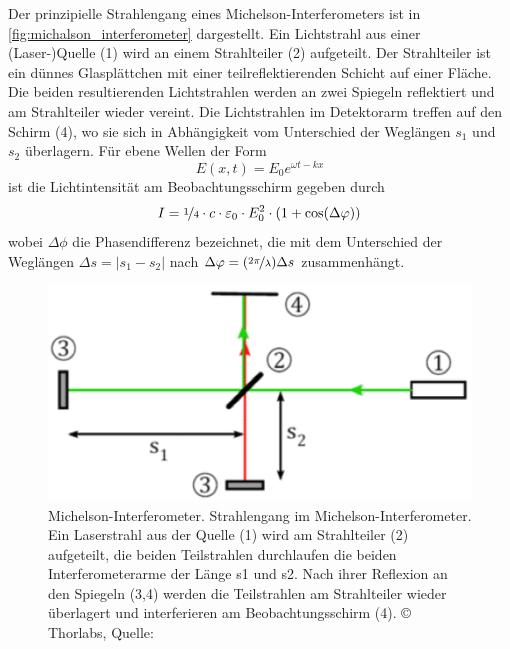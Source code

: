 \documentclass[ngerman]{scrartcl}
\begin{document}
Der prinzipielle Strahlengang eines Michelson-Interferometers ist in \autoref{fig:michalson_interferometer} dargestellt. Ein Lichtstrahl aus einer (Laser-)Quelle (1) wird an einem Strahlteiler (2) aufgeteilt. Der Strahlteiler ist ein dünnes Glasplättchen mit einer teilreflektierenden Schicht auf einer Fläche. Die beiden resultierenden Lichtstrahlen werden an zwei Spiegeln reflektiert und am Strahlteiler wieder vereint. Die Lichtstrahlen im Detektorarm treffen auf den Schirm (4), wo sie sich in Abhängigkeit vom Unterschied der Weglängen $s_1$ und $s_2$ überlagern. Für ebene Wellen der Form
\begin{equation}
    E(x,t) = E_0 e^{\omega t - k x}
\end{equation}
ist die Lichtintensität am Beobachtungsschirm gegeben durch
\begin{equation}
    I = \nicefrac{1}{4} \cdot c \cdot \varepsilon_0 \cdot E_0^2 \cdot (1 + \cos(\Delta \varphi))
\end{equation}
wobei $\Delta \phi$ die Phasendifferenz bezeichnet, die mit dem Unterschied der Weglängen\linebreak
$\Delta s = \left| s_1 - s_2 \right|$ nach $\Delta \varphi = (\nicefrac{2 \pi}{\lambda})\Delta s$ zusammenhängt.

\begin{figure}[H]
    \centering
    \begin{samepage}
        \includegraphics[width=0.6\linewidth]{fig/Compressed/Angabe_Abb8.png}
        \caption[Michelson-Interferometer]{Michelson-Interferometer. Strahlengang im Michelson-Interferometer. Ein Laserstrahl aus der Quelle (1) wird am Strahlteiler (2) aufgeteilt, die beiden Teilstrahlen durchlaufen die beiden Interferometerarme der Länge s1 und s2. Nach ihrer Reflexion an den Spiegeln (3,4) werden die Teilstrahlen am Strahlteiler wieder überlagert und interferieren am Beobachtungsschirm (4). \copyright{} Thorlabs, Quelle: \cite{ref:angabe}}
        \label{fig:michalson_interferometer}
    \end{samepage}
\end{figure}
\end{document}
